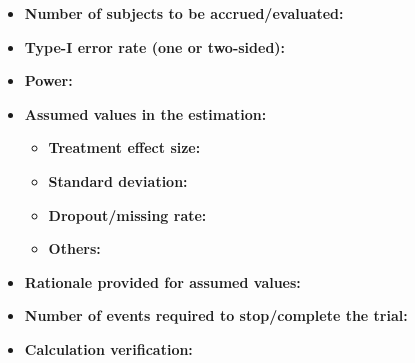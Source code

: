 \begin{itemize}
    \item \textbf{Number of subjects to be accrued/evaluated: } 

    \item \textbf{Type-I error rate (one or two-sided): } %
    \item \textbf{Power: } %
    \item \textbf{Assumed values in the estimation: } %
    \begin{itemize}
        \item \textbf{Treatment effect size: }
        \item \textbf{Standard deviation: } %
        \item \textbf{Dropout/missing rate: } %
        \item \textbf{Others: } %
    \end{itemize}
    \item \textbf{Rationale provided for assumed values: } %
    \item \textbf{Number of events required to stop/complete the trial: } %
    \item \textbf{Calculation verification: }
\end{itemize}